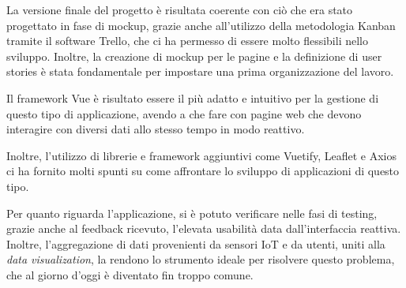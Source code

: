 \documentclass[a4paper]{report}
\begin{document}
La versione finale del progetto è risultata coerente con ciò che era stato progettato in fase di mockup, grazie anche all’utilizzo della metodologia Kanban tramite il software Trello, che ci ha permesso di essere molto flessibili nello sviluppo. Inoltre, la creazione di mockup per le pagine e la definizione di user stories è stata fondamentale per impostare una prima organizzazione del lavoro.

Il framework Vue è risultato essere il più adatto e intuitivo per la gestione di questo tipo di applicazione, avendo a che fare con pagine web che devono interagire con diversi dati allo stesso tempo in modo reattivo.

Inoltre, l’utilizzo di librerie e framework aggiuntivi come Vuetify, Leaflet e Axios ci ha fornito molti spunti su come affrontare lo sviluppo di applicazioni di questo tipo.

Per quanto riguarda l’applicazione, si è potuto verificare nelle fasi di testing, grazie anche al feedback ricevuto, l’elevata usabilità data dall’interfaccia reattiva. Inoltre, l’aggregazione di dati provenienti da sensori IoT e da utenti, uniti alla \textit{data visualization}, la rendono lo strumento ideale per risolvere questo problema, che al giorno d’oggi è diventato fin troppo comune.
\end{document}
